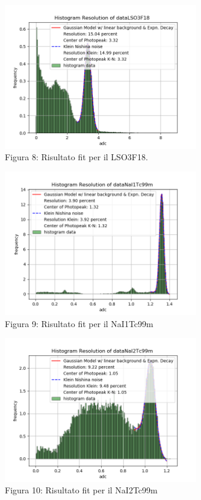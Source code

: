 \documentclass[a4paper]{article}
\begin{document}
\begin{figure}[H]
\centering
\includegraphics[width=0.75\textwidth]{histkleindataLSO3F18}
\caption{Figura 8: Risultato fit per il LSO3F18.}
\end{figure}
\begin{figure}[H]
\centering
\includegraphics[width=0.75\textwidth]{histkleindataNaI1Tc99m}
\caption{Figura 9: Risultato fit per il NaI1Tc99m}
\end{figure}
\begin{figure}[H]
\centering
\includegraphics[width=0.75\textwidth]{histkleindataNaI2Tc99m}
\caption{Figura 10: Risultato fit per il NaI2Tc99m}
\end{figure}
\end{document}
